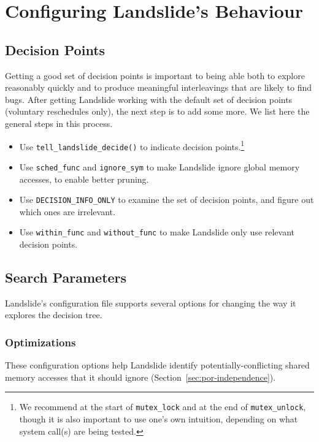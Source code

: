 \section{Configuring Landslide's Behaviour}
\label{sec:using-customise}
\subsection{Decision Points}
\label{sec:using-decision}

Getting a good set of decision points is important to being able both to explore reasonably quickly and to produce meaningful interleavings that are likely to find bugs. After getting Landslide working with the default set of decision points (voluntary reschedules only), the next step is to add some more. We list here the general steps in this process.

\begin{itemize}
        \item Use \texttt{tell\_landslide\_decide()} to indicate decision points.\footnote{
	We recommend at the start of \texttt{mutex\_lock} and at the end of \texttt{mutex\_unlock}, though it is also important to use one's own intuition, depending on what system call(s) are being tested.}
        \item Use \texttt{sched\_func} and \texttt{ignore\_sym} to make Landslide ignore global memory accesses, to enable better pruning.
        \item Use \texttt{DECISION\_INFO\_ONLY} to examine the set of decision points, and figure out which ones are irrelevant.
        \item Use \texttt{within\_func} and \texttt{without\_func} to make Landslide only use relevant decision points.
\end{itemize}

\subsection{Search Parameters}
\label{sec:using-search}

Landslide's configuration file supports several options for changing the way it explores the decision tree.

\subsubsection{Optimizations}

These configuration options help Landslide identify potentially-conflicting shared memory accesses that it should ignore (Section~\ref{sec:por-independence}).

